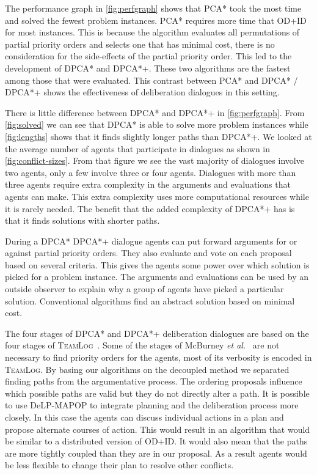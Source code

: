 The performance graph in \autoref{fig:perfgraph} shows that PCA* took the most 
time and solved the fewest problem instances. PCA* requires more time that 
OD+ID for most instances. This is because the algorithm 
evaluates all permutations of partial priority orders and selects one that has
minimal cost, there is no consideration for the side-effects of the partial 
priority order. This led to the development of DPCA* and DPCA*+. These two 
algorithms are the fastest among those that were evaluated. This contrast 
between PCA* and DPCA* / DPCA*+ shows the effectiveness of deliberation 
dialogues in this setting.

There is little difference between DPCA* and DPCA*+ in \autoref{fig:perfgraph}. 
From \autoref{fig:solved} we can see that DPCA* is able to solve more problem 
instances while \autoref{fig:lengths} shows that it finds slightly longer paths 
than DPCA*+. We looked at the average number of agents that participate in 
dialogues as shown in \autoref{fig:conflict-sizes}. From that figure we see the 
vast majority of dialogues involve two agents, only a few involve three or four 
agents. Dialogues with more than three agents require extra complexity in the 
arguments and evaluations that agents can make. This extra complexity uses more 
computational resources while it is rarely needed. The benefit that the added 
complexity of DPCA*+ has is that it finds solutions with shorter paths.

During a DPCA* DPCA*+ dialogue agents can put forward arguments for or against 
partial 
priority orders. They also evaluate and vote on each proposal based on several 
criteria. This gives the agents some power over which solution 
is picked for a problem instance. The arguments and evaluations can be used by 
an outside observer to explain why a group of agents have picked a particular 
solution. Conventional algorithms find an abstract solution based on minimal 
cost. 

The four stages of DPCA* and DPCA*+ deliberation dialogues are based on the 
four stages of \textsc{TeamLog}~\cite{dunin-keplicz2011}. Some of the stages of 
McBurney \emph{et al.}~ are not necessary to find 
priority orders for the agents, most of its verbosity is encoded in 
\textsc{TeamLog}. By basing our algorithms on the decoupled method we separated 
finding paths from 
the argumentative process. The ordering proposals influence which possible 
paths are valid but they do not directly alter a path. It is possible to use 
\textsf{DeLP-MAPOP} to integrate planning and the deliberation process more 
closely. In this case the agents can discuss individual actions in a plan and 
propose alternate courses of action. This would result in an algorithm that 
would be similar to a distributed version of OD+ID. It would also mean that the 
paths are more tightly coupled than they are in our proposal. As a result 
agents would be less flexible to change their plan to resolve other conflicts.

